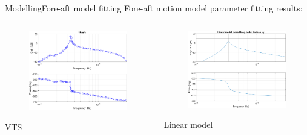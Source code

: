 \begin{frame}{Modelling}{Fore-aft model fitting}
	Fore-aft motion model parameter fitting results:
	\begin{columns}
		\begin{column}{.49\textwidth}
			\begin{figure}[ht]
				\centering
				\includegraphics[width=1\linewidth]{../Graphics/TestResults/foreaftFitting/sysid_thSine-vy_16ms.png}
				\label{fig:sysid_wref-vy_16}
			\end{figure}
			\centering VTS
		\end{column}
	
		\begin{column}{.49\textwidth}
			\begin{figure}[ht]
				\centering
				\includegraphics[width=1\linewidth]{../Graphics/TestResults/foreaftFitting/wtLin_th-vy_16ms.png}
				\label{fig:wtlin_wref-vy_16}
			\end{figure}
			\centering Linear model
		\end{column}
	\end{columns}
	
\end{frame}

